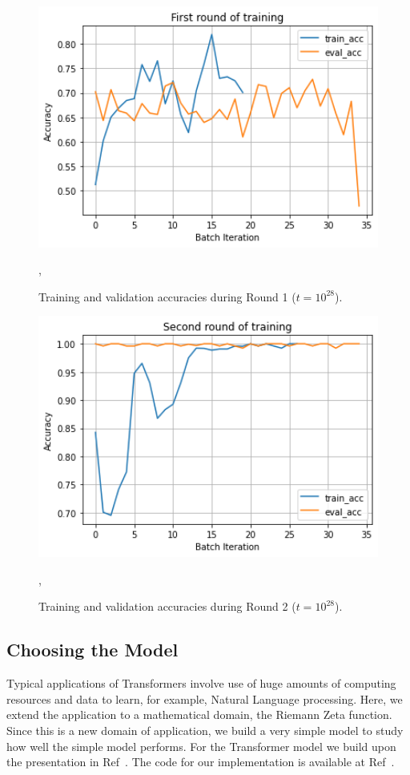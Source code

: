 \documentclass[twoside]{article}
\begin{document}
\begin{figure}
\includegraphics[width=1.0\textwidth]{Round1_28.png}
\caption[]{ 
 Training and validation accuracies during Round 1 ($t=10^{28}$).
 }
\vspace{1mm}, 
\label{fig:round1_28}
\end{figure}


\begin{figure}
\includegraphics[width=1.0\textwidth]{Round2_28.png}
\caption[]{ 
 Training and validation accuracies during Round 2 ($t=10^{28}$).
 }
\vspace{1mm}, 
\label{fig:round2_28}
\end{figure}



\subsection{\label{sec3.1} Choosing the Model}
Typical applications of Transformers involve use of huge amounts of computing resources and data to learn, for example, Natural Language processing. Here, we extend the application to a mathematical domain, the Riemann Zeta function. Since this is a new domain of application, we build a very simple model to study how well the simple model performs. For the Transformer model we build upon the presentation in  Ref~\cite{BenjaminEtienne}. The code for our implementation is available at 
 Ref~\cite{shankergit}.
\end{document}
